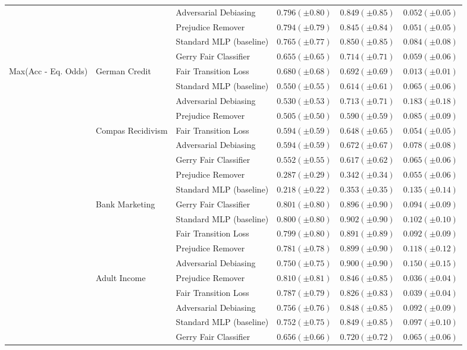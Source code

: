 \begin{tabular}{llllll}
 &  & Adversarial Debiasing & $0.796 (\pm0.80)$ & $0.849 (\pm0.85)$ & $0.052 (\pm0.05)$ \\
 &  & Prejudice Remover & $0.794 (\pm0.79)$ & $0.845 (\pm0.84)$ & $0.051 (\pm0.05)$ \\
 &  & Standard MLP (baseline) & $0.765 (\pm0.77)$ & $0.850 (\pm0.85)$ & $0.084 (\pm0.08)$ \\
 &  & Gerry Fair Classifier & $0.655 (\pm0.65)$ & $0.714 (\pm0.71)$ & $0.059 (\pm0.06)$ \\
\cline{1-6} \cline{2-6}
\multirow[t]{19}{*}{Max(Acc - Eq. Odds)} & \multirow[t]{4}{*}{German Credit} & Fair Transition Loss & $0.680 (\pm0.68)$ & $0.692 (\pm0.69)$ & $0.013 (\pm0.01)$ \\
 &  & Standard MLP (baseline) & $0.550 (\pm0.55)$ & $0.614 (\pm0.61)$ & $0.065 (\pm0.06)$ \\
 &  & Adversarial Debiasing & $0.530 (\pm0.53)$ & $0.713 (\pm0.71)$ & $0.183 (\pm0.18)$ \\
 &  & Prejudice Remover & $0.505 (\pm0.50)$ & $0.590 (\pm0.59)$ & $0.085 (\pm0.09)$ \\
\cline{2-6}
 & \multirow[t]{5}{*}{Compas Recidivism} & Fair Transition Loss & $0.594 (\pm0.59)$ & $0.648 (\pm0.65)$ & $0.054 (\pm0.05)$ \\
 &  & Adversarial Debiasing & $0.594 (\pm0.59)$ & $0.672 (\pm0.67)$ & $0.078 (\pm0.08)$ \\
 &  & Gerry Fair Classifier & $0.552 (\pm0.55)$ & $0.617 (\pm0.62)$ & $0.065 (\pm0.06)$ \\
 &  & Prejudice Remover & $0.287 (\pm0.29)$ & $0.342 (\pm0.34)$ & $0.055 (\pm0.06)$ \\
 &  & Standard MLP (baseline) & $0.218 (\pm0.22)$ & $0.353 (\pm0.35)$ & $0.135 (\pm0.14)$ \\
\cline{2-6}
 & \multirow[t]{5}{*}{Bank Marketing} & Gerry Fair Classifier & $0.801 (\pm0.80)$ & $0.896 (\pm0.90)$ & $0.094 (\pm0.09)$ \\
 &  & Standard MLP (baseline) & $0.800 (\pm0.80)$ & $0.902 (\pm0.90)$ & $0.102 (\pm0.10)$ \\
 &  & Fair Transition Loss & $0.799 (\pm0.80)$ & $0.891 (\pm0.89)$ & $0.092 (\pm0.09)$ \\
 &  & Prejudice Remover & $0.781 (\pm0.78)$ & $0.899 (\pm0.90)$ & $0.118 (\pm0.12)$ \\
 &  & Adversarial Debiasing & $0.750 (\pm0.75)$ & $0.900 (\pm0.90)$ & $0.150 (\pm0.15)$ \\
\cline{2-6}
 & \multirow[t]{5}{*}{Adult Income} & Prejudice Remover & $0.810 (\pm0.81)$ & $0.846 (\pm0.85)$ & $0.036 (\pm0.04)$ \\
 &  & Fair Transition Loss & $0.787 (\pm0.79)$ & $0.826 (\pm0.83)$ & $0.039 (\pm0.04)$ \\
 &  & Adversarial Debiasing & $0.756 (\pm0.76)$ & $0.848 (\pm0.85)$ & $0.092 (\pm0.09)$ \\
 &  & Standard MLP (baseline) & $0.752 (\pm0.75)$ & $0.849 (\pm0.85)$ & $0.097 (\pm0.10)$ \\
 &  & Gerry Fair Classifier & $0.656 (\pm0.66)$ & $0.720 (\pm0.72)$ & $0.065 (\pm0.06)$ \\
\cline{1-6} \cline{2-6}
\bottomrule
\end{tabular}
